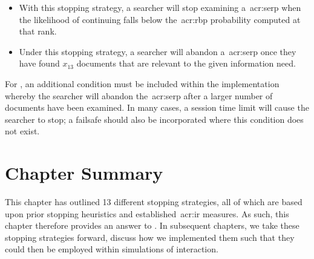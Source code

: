 \begin{itemize}
    \item{ With this stopping strategy, a searcher will stop examining a~\gls{acr:serp} when the likelihood of continuing falls below the~\gls{acr:rbp} probability computed at that rank.}
    
    \item{ Under this stopping strategy, a searcher will abandon a~\gls{acr:serp} once they have found $x_{13}$ documents that are relevant to the given information need.}
\end{itemize}

For , an additional condition must be included within the implementation whereby the searcher will abandon the~\gls{acr:serp} after a larger number of documents have been examined. In many cases, a session time limit will cause the searcher to stop; a failsafe should also be incorporated where this condition does not exist.

\section{Chapter Summary}
This chapter has outlined 13 different stopping strategies, all of which are based upon prior stopping heuristics and established~\gls{acr:ir} measures. As such, this chapter therefore provides an answer to . In subsequent chapters, we take these stopping strategies forward, discuss how we implemented them such that they could then be employed within simulations of interaction.